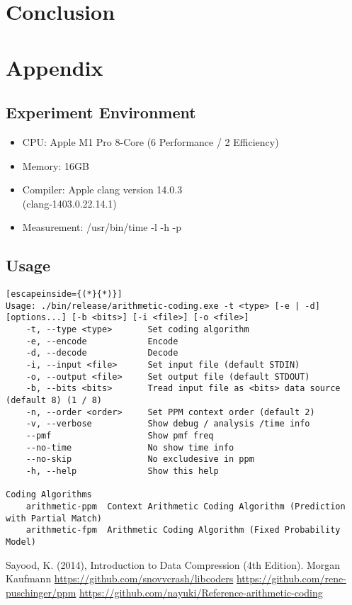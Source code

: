 \documentclass[a4paper,conference]{IEEEtran}
\begin{document}
\section{Conclusion}


\section{Appendix}

\subsection{Experiment Environment}

\begin{itemize}
\item CPU: Apple M1 Pro 8-Core (6 Performance / 2 Efficiency)
\item Memory: 16GB
\item Compiler: Apple clang version 14.0.3 \\ (clang-1403.0.22.14.1)
\item Measurement: /usr/bin/time -l -h -p
\end{itemize}

\subsection{Usage}

\begin{lstlisting}[escapeinside={(*}{*)}]
Usage: ./bin/release/arithmetic-coding.exe -t <type> [-e | -d] [options...] [-b <bits>] [-i <file>] [-o <file>]
    -t, --type <type>       Set coding algorithm
    -e, --encode            Encode
    -d, --decode            Decode
    -i, --input <file>      Set input file (default STDIN)
    -o, --output <file>     Set output file (default STDOUT)
    -b, --bits <bits>       Tread input file as <bits> data source (default 8) (1 / 8)
    -n, --order <order>     Set PPM context order (default 2)
    -v, --verbose           Show debug / analysis /time info
    --pmf                   Show pmf freq
    --no-time               No show time info
    --no-skip               No excludesive in ppm
    -h, --help              Show this help

Coding Algorithms
    arithmetic-ppm  Context Arithmetic Coding Algorithm (Prediction with Partial Match)
    arithmetic-fpm  Arithmetic Coding Algorithm (Fixed Probability Model)
\end{lstlisting}

\begin{thebibliography}{00}
 Sayood, K. (2014), Introduction to Data Compression (4th Edition). Morgan Kaufmann
 \url{https://github.com/snovvcrash/libcoders}
 \url{https://github.com/rene-puschinger/ppm}
 \url{https://github.com/nayuki/Reference-arithmetic-coding}
\end{thebibliography}
\end{document}
